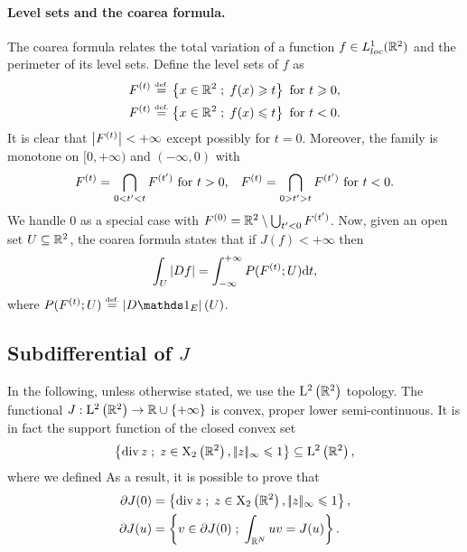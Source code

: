 \paragraph{Level sets and the coarea formula.}
The coarea formula relates the total variation of a function $f\in L^1_{loc}(\mathbb{R}^2)$ and the perimeter of its level sets. Define the level sets of $f$ as
\begin{equation}\label{eq:lev_sets}
\begin{split}
  F^{(t)}\stackrel{\mbox{\upshape\tiny def.}}{=} \left\{ x\in\mathbb{R}^2 \;;\; f(x)\geqslant t \right\} \mbox{ for } t\geqslant 0,\\
  F^{(t)}\stackrel{\mbox{\upshape\tiny def.}}{=} \left\{ x\in\mathbb{R}^2 \;;\; f(x)\leqslant t \right\} \mbox{ for } t< 0.
  \end{split}
\end{equation}
It is clear that $\left| F^{(t)} \right|<+\infty$ except possibly for $t=0$. Moreover, the family is monotone on $[0,+\infty)$ and $(-\infty,0)$ with
\begin{equation*}
  F^{(t)}=\bigcap_{0<t'<t}F^{(t')} \mbox{ for $t>0$,} \quad  F^{(t)}=\bigcap_{0>t'>t}F^{(t')} \mbox{ for $t<0$}.
\end{equation*}
We handle $0$ as a special case with $F^{(0)}=\mathbb{R}^2\setminus\bigcup_{t'<0}F^{(t')}$.
Now, given an open set $U\subseteq \mathbb{R}^2$, the coarea formula states that if $J(f)<+\infty$ then
\begin{equation*}
  \int_{U}\left| Df \right| =\int_{-\infty}^{+\infty} P(F^{(t)};U)\mathrm{d} t,
\end{equation*}
where $P(\F{t};U)\eqdef \abs{D\bun{E}}(U)$.

\subsection{Subdifferential of $J$}
\label{sec-subdiff}

In the following, unless otherwise stated, we use the $\mathrm{L}^2\left(\mathbb{R}^2\right)$ topology. The functional $J:\mathrm{L}^2\left(\mathbb{R}^2\right)\rightarrow \mathbb{R}\cup \{+\infty\}$ is convex, proper lower semi-continuous. It is in fact the support function of the closed convex set
\begin{equation*}
  \left\{ \operatorname{div} z  \;;\; z\in \mathrm{X}_2\left(\mathbb{R}^2\right), |\!| z |\!|_{\infty}\leqslant 1 \right\}\subseteq \mathrm{L}^2\left(\mathbb{R}^2\right), 
\end{equation*}
where we defined 
As a result, it is possible to prove that
\begin{align}
  \label{eq:tvsubdiff}
  \partial J(0)&= \left\{ \operatorname{div} z  \;;\; z\in \mathrm{X}_2\left(\mathbb{R}^2\right), |\!| z |\!|_{\infty}\leqslant 1 \right\},\\
\label{eq:tvsubdiffu}  \partial J(u)&= \left\{ v\in \partial J(0)  \;;\; \int_{\mathbb{R}^N} uv = J(u) \right\}.
\end{align}

